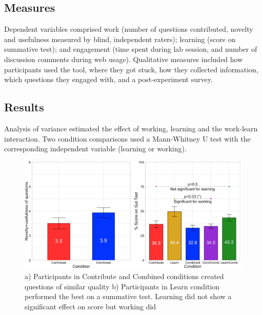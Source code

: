 \subsection*{Measures}
Dependent variables comprised work (number of questions contributed, novelty and usefulness measured by blind, independent raters); learning (score on summative test); and engagement (time spent during lab session, and number of discussion comments during web usage). Qualitative measures included how participants used the tool, where they got stuck, how they collected information, which questions they engaged with, and a post-experiment survey.

\subsection*{Results}
Analysis of variance estimated the effect of working, learning and the work-learn interaction. Two condition comparisons used a Mann-Whitney U test with the corresponding independent variable (learning or working). 


\begin{figure}[h] 
  \centering
  \includegraphics[width=1.0\textwidth]{figures/gutinstinct/gi-7.png}
  \caption[Results: Question quality and Learning Score]
{a) Participants in Contribute and Combined conditions created questions of similar quality b) Participants in Learn condition performed the best on a summative test. Learning did not show a significant effect on score but working did }
  \label{fig:gi-7}
\end{figure}

